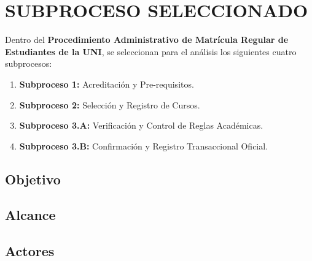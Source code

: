 \section{SUBPROCESO SELECCIONADO}

Dentro del \textbf{Procedimiento Administrativo de Matrícula Regular de Estudiantes de la UNI}, se seleccionan para el análisis los siguientes cuatro subprocesos:
\begin{enumerate}
\item \textbf{Subproceso 1:} Acreditación y Pre-requisitos.
\item \textbf{Subproceso 2:} Selección y Registro de Cursos.
\item \textbf{Subproceso 3.A:} Verificación y Control de Reglas Académicas.
\item \textbf{Subproceso 3.B:} Confirmación y Registro Transaccional Oficial.
\end{enumerate}

\subsection{Objetivo}





\subsection{Alcance}





\subsection{Actores}





